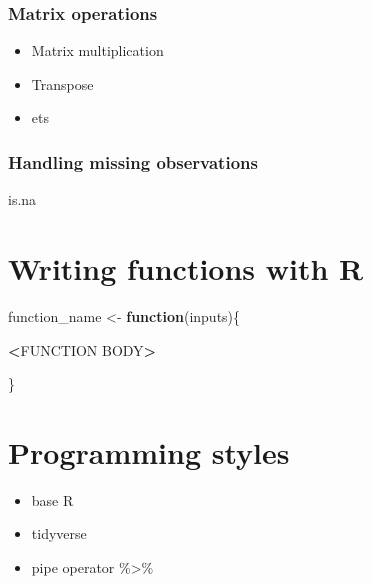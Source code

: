 \documentclass[]{article}
\newenvironment{Shaded}{\begin{snugshade}}{\end{snugshade}}
\newcommand{\ControlFlowTok}[1]{\textcolor[rgb]{0.13,0.29,0.53}{\textbf{#1}}}
\newcommand{\NormalTok}[1]{#1}
\newcommand{\OperatorTok}[1]{\textcolor[rgb]{0.81,0.36,0.00}{\textbf{#1}}}
\newcommand{\StringTok}[1]{\textcolor[rgb]{0.31,0.60,0.02}{#1}}
\begin{document}
\hypertarget{matrix-operations}{%
\subsubsection{Matrix operations}\label{matrix-operations}}

\begin{itemize}
\item
  Matrix multiplication
\item
  Transpose
\item
  ets
\end{itemize}

\hypertarget{handling-missing-observations}{%
\subsubsection{Handling missing
observations}\label{handling-missing-observations}}

\begin{Shaded}
\begin{Highlighting}[]
\NormalTok{is.na}
\end{Highlighting}
\end{Shaded}

\hypertarget{writing-functions-with-r}{%
\section{Writing functions with R}\label{writing-functions-with-r}}

\begin{Shaded}
\begin{Highlighting}[]
\NormalTok{function_name <-}\StringTok{ }\ControlFlowTok{function}\NormalTok{(inputs)\{}

\OperatorTok{<}\NormalTok{FUNCTION BODY}\OperatorTok{>}

\NormalTok{\}}
\end{Highlighting}
\end{Shaded}

\hypertarget{programming-styles}{%
\section{Programming styles}\label{programming-styles}}

\begin{itemize}
\item
  base R
\item
  tidyverse
\item
  pipe operator \%\textgreater{}\%
\end{itemize}
\end{document}
